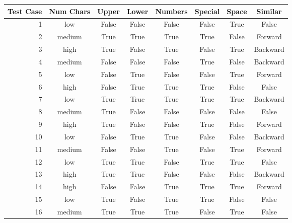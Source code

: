\documentclass[12pt,letterpaper]{article}
\begin{document}
\begin{tabular}{|r|c|c|c|c|c|c|c|}
\hline
\multicolumn{1}{|l|}{Test Case} & Num Chars & Upper & Lower & Numbers & Special & Space & Similar  \\ \hline
1                               & low       & False & False & False   & False   & True  & False    \\ \hline
2                               & medium    & True  & True  & True    & True    & False & Forward  \\ \hline
3                               & high      & True  & False & True    & False   & True  & Backward \\ \hline
4                               & medium    & False & False & False   & True    & False & Backward \\ \hline
5                               & low       & False & True  & False   & False   & True  & Forward  \\ \hline
6                               & high      & False & True  & True    & True    & False & False    \\ \hline
7                               & low       & True  & True  & True    & True    & True  & Backward \\ \hline
8                               & medium    & True  & False & False   & False   & False & False    \\ \hline
9                               & high      & True  & False & False   & True    & False & Forward  \\ \hline
10                              & low       & False & True  & True    & False   & False & Backward \\ \hline
11                              & medium    & False & False & True    & False   & True  & Forward  \\ \hline
12                              & low       & True  & True  & False   & True    & True  & False    \\ \hline
13                              & high      & True  & True  & False   & False   & False & Backward \\ \hline
14                              & high      & False & False & True    & True    & True  & Forward  \\ \hline
15                              & low       & True  & False & True    & True    & False & False    \\ \hline
16                              & medium    & True  & True  & True    & False   & True  & False    \\ \hline

\end{tabular}
\end{document}
